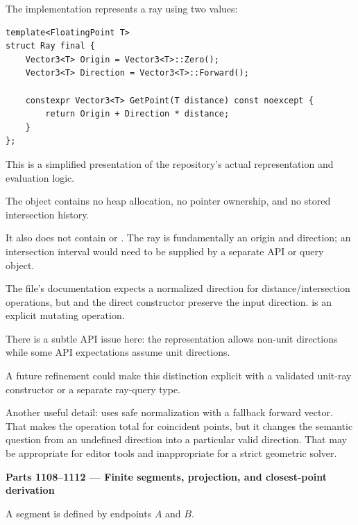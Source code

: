 The implementation represents a ray using two  values:

\begin{verbatim}
template<FloatingPoint T>
struct Ray final {
    Vector3<T> Origin = Vector3<T>::Zero();
    Vector3<T> Direction = Vector3<T>::Forward();

    constexpr Vector3<T> GetPoint(T distance) const noexcept {
        return Origin + Direction * distance;
    }
};
\end{verbatim}

This is a simplified presentation of the repository's actual representation and evaluation logic.

The object contains no heap allocation, no pointer ownership, and no stored intersection history.

It also does not contain  or . The ray is fundamentally an origin and direction; an intersection interval would need to be supplied by a separate API or query object.

The file's documentation expects a normalized direction for distance/intersection operations, but  and the direct constructor preserve the input direction.  is an explicit mutating operation.

There is a subtle API issue here: the representation allows non-unit directions while some API expectations assume unit directions.

A future refinement could make this distinction explicit with a validated unit-ray constructor or a separate ray-query type.

Another useful detail:  uses safe normalization with a fallback forward vector. That makes the operation total for coincident points, but it changes the semantic question from an undefined direction into a particular valid direction. That may be appropriate for editor tools and inappropriate for a strict geometric solver.

\textbf{Parts 1108--1112 --- Finite segments, projection, and closest-point derivation}

A segment is defined by endpoints \(A\) and \(B\).

